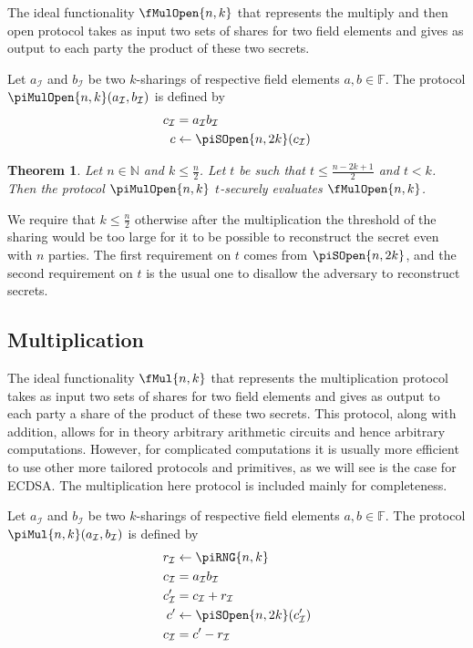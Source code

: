 \documentclass{article}
\newtheorem{theorem}{Theorem}
\theoremstyle{remark}
\newcommand{\N}{\mathbb{N}}
\newcommand{\F}{\mathbb{F}}
\begin{document}
The ideal functionality $\fMulOpen{n,k}$ that represents the multiply and then
open protocol takes as input two sets of shares for two field elements and
gives as output to each party the product of these two secrets.

Let $a_\mathcal{I}$ and $b_\mathcal{I}$ be two $k$-sharings of respective field
elements $a, b \in \F$. The protocol $\piMulOpen{n,k}(a_\mathcal{I},
b_\mathcal{I})$ is defined by
\begin{align*}
	c_\mathcal{I} &= a_\mathcal{I}b_\mathcal{I}\\
	c &\leftarrow \piSOpen{n,2k}(c_\mathcal{I})
\end{align*}

\begin{theorem}
	Let $n \in \N$ and $k \le \frac{n}{2}$. Let $t$ be such that $t \le \frac{n
	- 2k + 1}{2}$ and $t < k$. Then the protocol $\piMulOpen{n,k}$ $t$-securely
	evaluates $\fMulOpen{n,k}$.
\end{theorem}

We require that $k \le \frac{n}{2}$ otherwise after the multiplication the
threshold of the sharing would be too large for it to be possible to
reconstruct the secret even with $n$ parties. The first requirement on $t$
comes from $\piSOpen{n,2k}$, and the second requirement on $t$ is the usual one
to disallow the adversary to reconstruct secrets.

\subsection{Multiplication}

The ideal functionality $\fMul{n,k}$ that represents the multiplication
protocol takes as input two sets of shares for two field elements and gives as
output to each party a share of the product of these two secrets. This
protocol, along with addition, allows for in theory arbitrary arithmetic
circuits and hence arbitrary computations. However, for complicated
computations it is usually more efficient to use other more tailored protocols
and primitives, as we will see is the case for ECDSA\@. The multiplication here
protocol is included mainly for completeness.

Let $a_\mathcal{I}$ and $b_\mathcal{I}$ be two $k$-sharings of respective field
elements $a, b \in \F$. The protocol $\piMul{n,k}(a_\mathcal{I},
b_\mathcal{I})$ is defined by
\begin{align*}
	r_\mathcal{I} &\leftarrow \piRNG{n,k}\\
	c_\mathcal{I} &= a_\mathcal{I}b_\mathcal{I}\\
	c'_\mathcal{I} &= c_\mathcal{I} + r_\mathcal{I}\\
	c' &\leftarrow \piSOpen{n,2k}(c'_\mathcal{I})\\
	c_\mathcal{I} &= c' - r_\mathcal{I}
\end{align*}
\end{document}
